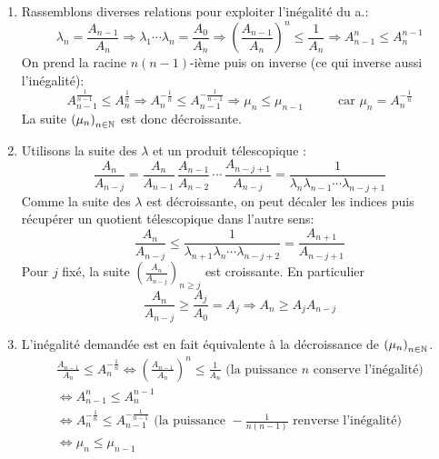 \begin{enumerate}
\begin{enumerate}
  \item Rassemblons diverses relations pour exploiter l'inégalité du a.:
\begin{displaymath}
\lambda_n = \frac{A_{n-1}}{A_n} \Rightarrow \lambda_1 \cdots \lambda_n = \frac{A_0}{A_n} \Rightarrow \left(\frac{A_{n-1}}{A_n} \right)^{n}\leq \frac{1}{A_n}
\Rightarrow A_{n-1}^n \leq A_{n}^{n-1}
\end{displaymath}
On prend la racine $n(n-1)$-ième puis on inverse (ce qui inverse aussi l'inégalité):
\begin{displaymath}
  A_{n-1}^{\frac{1}{n-1}} \leq A_n^{\frac{1}{n}} \Rightarrow A_n^{-\frac{1}{n}} \leq A_{n-1}^{-\frac{1}{n-1}} \Rightarrow \mu_n \leq \mu_{n-1}
  \hspace{1cm} \text{ car } \mu_n = A_n^{-\frac{1}{n}} 
\end{displaymath}
La suite $\left( \mu_n\right)_{n\in \mathbb{N}}$ est donc décroissante.

  \item Utilisons la suite des $\lambda$ et un produit télescopique :
\begin{displaymath}
  \frac{A_n}{A_{n-j}} = \frac{A_n}{A_{n-1}}\, \frac{A_{n-1}}{A_{n-2}}\,\cdots \, \frac{A_{n-j+1}}{A_{n-j}}
= \frac{1}{\lambda_n \lambda_{n-1} \cdots \lambda_{n-j+1}}
\end{displaymath}
Comme la suite des $\lambda$ est décroissante, on peut décaler les indices puis récupérer un quotient télescopique dans l'autre sens:
\begin{displaymath}
\frac{A_n}{A_{n-j}} \leq \frac{1}{\lambda_{n+1} \lambda_{n} \cdots \lambda_{n-j+2}} = \frac{A_{n+1}}{A_{n-j+1}}
\end{displaymath}
Pour $j$ fixé, la suite $\left( \frac{A_n}{A_{n-j}}\right)_{n\geq j}$ est croissante. En particulier
\begin{displaymath}
  \frac{A_n}{A_{n-j}} \geq \frac{A_j}{A_0} = A_j \Rightarrow A_n\geq A_j A_{n-j}
\end{displaymath}

  \item L'inégalité demandée est en fait équivalente à la décroissance de $\left( \mu_n\right)_{n\in \mathbb{N}}$.
\begin{multline*}
\frac{A_{n-1}}{A_n}\leq A_n^{-\frac{1}{n}} \Leftrightarrow   \left( \frac{A_{n-1}}{A_n}\right)^{n} \leq \frac{1}{A_n}
\text{ (la puissance } n \text{ conserve l'inégalité)}\\
\Leftrightarrow A_{n-1}^{n} \leq A_n^{n-1}\\
\Leftrightarrow  A_n^{-\frac{1}{n}} \leq A_{n-1}^{-\frac{1}{n-1}} \text{ (la puissance } -\frac{1}{n(n-1)} \text{ renverse l'inégalité)}\\
\Leftrightarrow \mu_n \leq \mu_{n-1}
\end{multline*}
\end{enumerate}
\end{enumerate}

